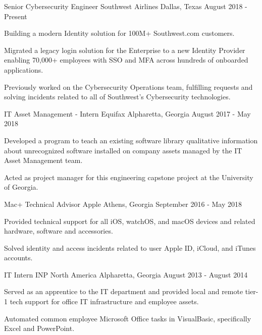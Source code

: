 \begin{cventries}
  \cventry
    {Senior Cybersecurity Engineer}
    {Southwest Airlines}
    {Dallas, Texas}
    {August 2018 - Present}
    {
      \begin{cvitems}
        \item {Building a modern Identity solution for 100M+ Southwest.com customers.}
        \item {Migrated a legacy login solution for the Enterprise to a new Identity Provider enabling 70,000+ employees with SSO and MFA across hundreds of onboarded applications.}
        \item {Previously worked on the Cybersecurity Operations team, fulfilling requests and solving incidents related to all of Southwest's Cybersecurity technologies.}
      \end{cvitems}
    }
  \cventry
    {IT Asset Management - Intern}
    {Equifax}
    {Alpharetta, Georgia}
    {August 2017 - May 2018}
    {
      \begin{cvitems}
        \item {Developed a program to teach an existing software library qualitative information about unrecognized software installed on company assets managed by the IT Asset Management team.}
        \item {Acted as project manager for this engineering capstone project at the University of Georgia.}
      \end{cvitems}
    }
  \cventry
    {Mac+ Technical Advisor}
    {Apple}
    {Athens, Georgia}
    {September 2016 - May 2018}
    {
      \begin{cvitems}
        \item {Provided technical support for all iOS, watchOS, and macOS devices and related hardware, software and accessories.}
        \item {Solved identity and access incidents related to user Apple ID, iCloud, and iTunes accounts.}
      \end{cvitems}
    }
  \cventry
    {IT Intern}
    {INP North America}
    {Alpharetta, Georgia}
    {August 2013 - August 2014}
    {
      \begin{cvitems}
        \item {Served as an apprentice to the IT department and provided local and remote tier-1 tech support for office IT infrastructure and employee assets.}
        \item {Automated common employee Microsoft Office tasks in VisualBasic, specifically Excel and PowerPoint.}
      \end{cvitems}
    }
\end{cventries}